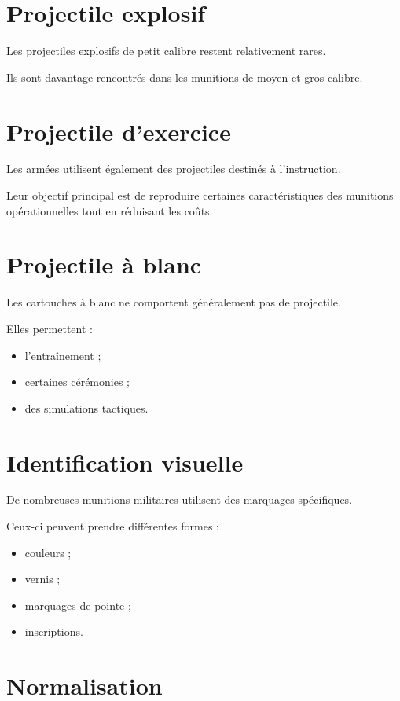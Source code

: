 \section{Projectile explosif}

Les projectiles explosifs de petit calibre restent relativement rares.

Ils sont davantage rencontrés dans les munitions de moyen et gros calibre.

\section{Projectile d'exercice}

Les armées utilisent également des projectiles destinés à l'instruction.

Leur objectif principal est de reproduire certaines caractéristiques des
munitions opérationnelles tout en réduisant les coûts.

\section{Projectile à blanc}

Les cartouches à blanc ne comportent généralement pas de projectile.

Elles permettent :

\begin{itemize}
    \item l'entraînement ;
    \item certaines cérémonies ;
    \item des simulations tactiques.
\end{itemize}

\section{Identification visuelle}

De nombreuses munitions militaires utilisent des marquages spécifiques.

Ceux-ci peuvent prendre différentes formes :

\begin{itemize}
    \item couleurs ;
    \item vernis ;
    \item marquages de pointe ;
    \item inscriptions.
\end{itemize}

\section{Normalisation}


